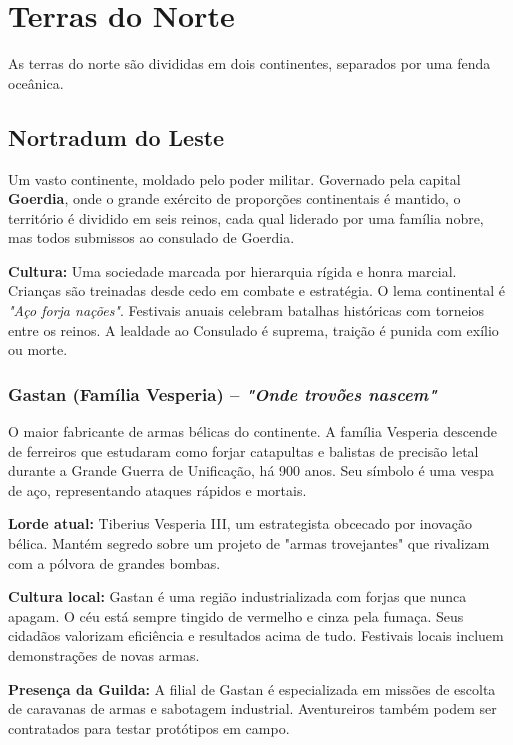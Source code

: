 
\section*{Terras do Norte}
As terras do norte são divididas em dois continentes, separados por uma fenda oceânica.

\subsection*{Nortradum do Leste}
Um vasto continente, moldado pelo poder militar. Governado pela capital \textbf{Goerdia}, onde o grande exército de proporções continentais é mantido, o território é dividido em seis reinos, cada qual liderado por uma família nobre, mas todos submissos ao consulado de Goerdia.

\textbf{\ringmfamily Cultura:} Uma sociedade marcada por hierarquia rígida e honra marcial. Crianças são treinadas desde cedo em combate e estratégia. O lema continental é \textit{"Aço forja nações"}. Festivais anuais celebram batalhas históricas com torneios entre os reinos. A lealdade ao Consulado é suprema, traição é punida com exílio ou morte.

\subsubsection*{Gastan (Família Vesperia) – \textit{"Onde trovões nascem"}}
O maior fabricante de armas bélicas do continente. A família Vesperia descende de ferreiros que estudaram como forjar catapultas e balistas de precisão letal durante a Grande Guerra de Unificação, há 900 anos. Seu símbolo é uma vespa de aço, representando ataques rápidos e mortais.

\textbf{\ringmfamily Lorde atual:} Tiberius Vesperia III, um estrategista obcecado por inovação bélica. Mantém segredo sobre um projeto de "armas trovejantes" que rivalizam com a pólvora de grandes bombas.

\textbf{\ringmfamily Cultura local:} Gastan é uma região industrializada com forjas que nunca apagam. O céu está sempre tingido de vermelho e cinza pela fumaça. Seus cidadãos valorizam eficiência e resultados acima de tudo. Festivais locais incluem demonstrações de novas armas.

\textbf{\ringmfamily Presença da Guilda:} A filial de Gastan é especializada em missões de escolta de caravanas de armas e sabotagem industrial. Aventureiros também podem ser contratados para testar protótipos em campo.

